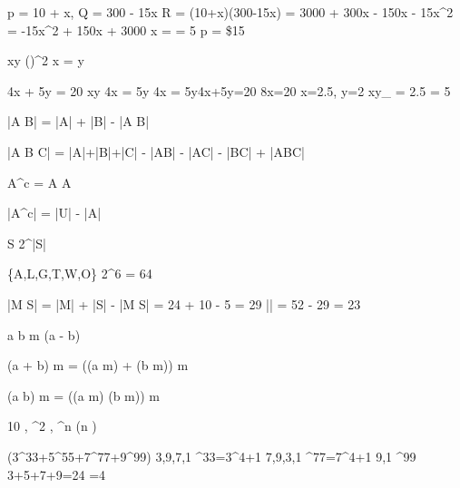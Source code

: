  \to {}
p = 10 + x, \quad Q = 300 - 15x
R = (10+x)(300-15x) = 3000 + 300x - 150x - 15x^2 = -15x^2 + 150x + 3000
 x =  = 5 \Rightarrow p = \$15

xy \le \left(\right)^2  x = y

 4x + 5y = 20 xy
 4x = 5y
4x = 5y4x+5y=20 \Rightarrow 8x=20 \Rightarrow x=2.5, y=2
xy_{\max} = 2.5  = 5


|A \cup B| = |A| + |B| - |A \cap B|

|A \cup B \cup C| = |A|+|B|+|C| - |A\cap B| - |A\cap C| - |B\cap C| + |A\cap B\cap C|

A^c =  A  A\text{)}

|A^c| = |U| - |A|

 S\text{: } 2^{|S|}

 \{A,L,G,T,W,O\}\text{: } 2^6 = 64

|M \cup S| = |M| + |S| - |M \cap S| = 24 + 10 - 5 = 29
|| = 52 - 29 = 23


a \equiv b  \iff m \mid (a - b)

(a + b) \bmod m = ((a \bmod m) + (b \bmod m)) \bmod m

(a \cdot b) \bmod m = ((a \bmod m) \cdot (b \bmod m)) \bmod m

10  , ^2  , ^n   \quad (n )

 (3^{33}+5^{55}+7^{77}+9^{99})\text{:}
3,9,7,1 ^{33}=3^{4+1}
7,9,3,1 ^{77}=7^{4+1}
9,1 ^{99}
 3+5+7+9=24 \Rightarrow {}=4

